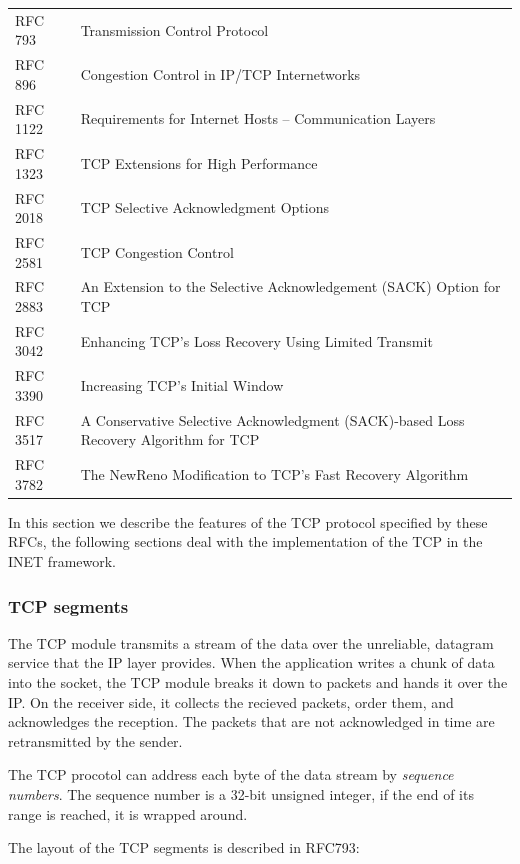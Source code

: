 \begin{tabular}{ll}
RFC 793 & Transmission Control Protocol \\
RFC 896 & Congestion Control in IP/TCP Internetworks \\
RFC 1122 & Requirements for Internet Hosts -- Communication Layers \\
RFC 1323 & TCP Extensions for High Performance \\
RFC 2018 & TCP Selective Acknowledgment Options \\
RFC 2581 & TCP Congestion Control \\
RFC 2883 & An Extension to the Selective Acknowledgement (SACK) Option for TCP \\
RFC 3042 & Enhancing TCP's Loss Recovery Using Limited Transmit \\
RFC 3390 & Increasing TCP's Initial Window \\
RFC 3517 & A Conservative Selective Acknowledgment (SACK)-based Loss Recovery \newline
                 Algorithm for TCP \\
RFC 3782 & The NewReno Modification to TCP's Fast Recovery Algorithm \\
\end{tabular}

In this section we describe the features of the TCP protocol specified by these RFCs,
the following sections deal with the implementation of the TCP in the INET framework.

\subsubsection{TCP segments}

The TCP module transmits a stream of the data over the unreliable, datagram service
that the IP layer provides. When the application writes a chunk of data into the socket,
the TCP module breaks it down to packets and hands it over the IP. On the receiver side,
it collects the recieved packets, order them, and acknowledges the reception. The packets
that are not acknowledged in time are retransmitted by the sender.

The TCP procotol can address each byte of the data stream by \emph{sequence numbers}.
The sequence number is a 32-bit unsigned integer, if the end of its range is reached,
it is wrapped around.

The layout of the TCP segments is described in RFC793:

